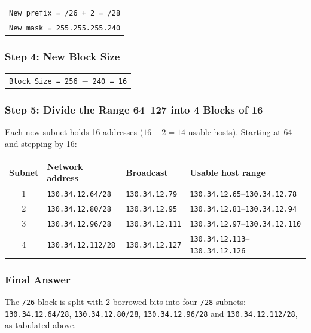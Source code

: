 \documentclass[11pt,a4paper]{article}
\begin{document}
\begin{tabularx}{\textwidth}{@{}X@{}}
\texttt{New prefix = /26 + 2 = /28} \\
\texttt{New mask = 255.255.255.240} \\
\end{tabularx}

\subsubsection*{Step 4: New Block Size}

\begin{tabularx}{\textwidth}{@{}X@{}}
\texttt{Block Size = 256 $-$ 240 = 16} \\
\end{tabularx}

\subsubsection*{Step 5: Divide the Range 64--127 into 4 Blocks of 16}

Each new subnet holds 16 addresses ($16 - 2 = 14$ usable hosts). Starting at 64
and stepping by 16:

\begin{tabularx}{\textwidth}{@{}clll@{}}
\toprule
\rowcolor{tablehead}\textbf{Subnet} & \textbf{Network address} & \textbf{Broadcast} & \textbf{Usable host range} \\
\midrule
1 & \texttt{130.34.12.64/28} & \texttt{130.34.12.79} & \texttt{130.34.12.65}--\texttt{130.34.12.78} \\
2 & \texttt{130.34.12.80/28} & \texttt{130.34.12.95} & \texttt{130.34.12.81}--\texttt{130.34.12.94} \\
3 & \texttt{130.34.12.96/28} & \texttt{130.34.12.111} & \texttt{130.34.12.97}--\texttt{130.34.12.110} \\
4 & \texttt{130.34.12.112/28} & \texttt{130.34.12.127} & \texttt{130.34.12.113}--\texttt{130.34.12.126} \\
\bottomrule
\end{tabularx}

\subsubsection*{Final Answer}

The \texttt{/26} block is split with 2 borrowed bits into four \texttt{/28}
subnets: \texttt{130.34.12.64/28}, \texttt{130.34.12.80/28},
\texttt{130.34.12.96/28} and \texttt{130.34.12.112/28}, as tabulated above.
\end{document}
